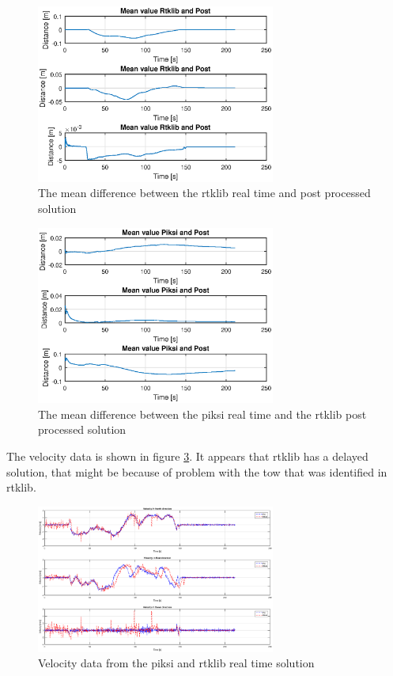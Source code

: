 \begin{figure}[H]
	\centering
		\includegraphics[width=0.7\textwidth]{figs/plots/meanrtkpost.eps}
		\caption{The mean difference between the rtklib real time and post processed solution}
		\label{figure:RTKLIB_STRUCTURE}
\end{figure}
\begin{figure}[H]
	\centering
		\includegraphics[width=0.7\textwidth]{figs/plots/meanpiksipost.eps}
		\caption{The mean difference between the piksi real time and the rtklib post processed solution}
		\label{figure:RTKLIB_STRUCTURE}
\end{figure}
The velocity data is shown in figure \ref{figure:VelocityWalk1}. It appears that rtklib has a delayed solution, that might be because of problem with the \gls{tow} that was identified in rtklib.
\begin{figure}[H]
	\centering
		\includegraphics[width=0.7\textwidth]{figs/plots/velocityWalk1.eps}
		\caption{Velocity data from the piksi and rtklib real time solution}
		\label{figure:VelocityWalk1}
\end{figure}
